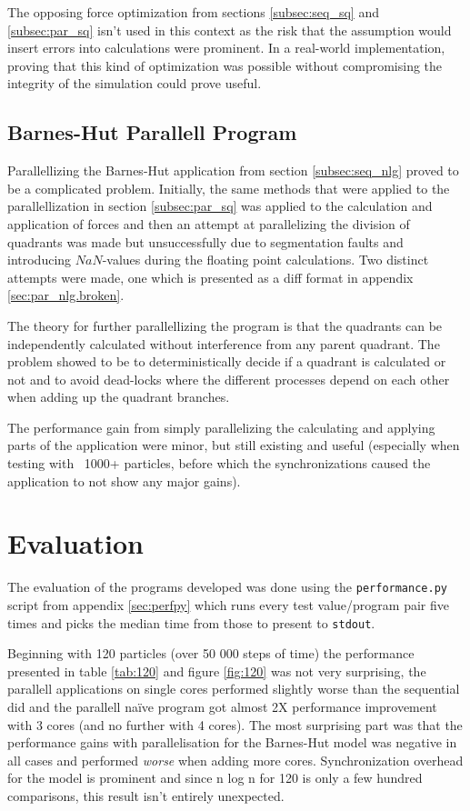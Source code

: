 \documentclass[titlepage,a4paper,12pt]{article}
\begin{document}
The opposing force optimization from sections \ref{subsec:seq_sq} and
\ref{subsec:par_sq} isn't used in this context as the risk that the assumption
would insert errors into calculations were prominent. In a real-world
implementation, proving that this kind of optimization was possible without
compromising the integrity of the simulation could prove useful.

\subsection{Barnes-Hut Parallell Program}
\label{subsec:par_nlg}
Parallellizing the Barnes-Hut application from section \ref{subsec:seq_nlg}
proved to be a complicated problem. Initially, the same methods that were
applied to the parallellization in section \ref{subsec:par_sq} was applied to
the calculation and application of forces and then an attempt at parallelizing
the division of quadrants was made but unsuccessfully due to segmentation faults
and introducing $NaN$-values during the floating point calculations.
Two distinct attempts were made, one which is presented as a diff format in
appendix \ref{sec:par_nlg.broken}.

The theory for further parallellizing the program is that the quadrants can be
independently calculated without interference from any parent quadrant. The
problem showed to be to deterministically decide if a quadrant is calculated or
not and to avoid dead-locks where the different processes depend on each other
when adding up the quadrant branches.

The performance gain from simply parallelizing the calculating and applying
parts of the application were minor, but still existing and useful (especially
when testing with ~1000+ particles, before which the synchronizations caused
the application to not show any major gains).

\section{Evaluation}

The evaluation of the programs developed was done using the
\texttt{performance.py} script from appendix \ref{sec:perfpy} which runs every
test value/program pair five times and picks the median time from those to
present to \texttt{stdout}.

Beginning with 120 particles (over 50 000 steps of time) the performance 
presented in table \ref{tab:120} and figure \ref{fig:120} was
not very surprising, the parallell applications on single cores performed
slightly worse than the sequential did and the parallell na\"{i}ve program
got almost 2X performance improvement with 3 cores (and no further with 4 
cores). The most surprising part was that the performance gains with
parallelisation for the Barnes-Hut model was negative in all cases and
performed \textit{worse} when adding more cores. Synchronization overhead
for the model is prominent and since n log n for 120 is only a few hundred
comparisons, this result isn't entirely unexpected.
\end{document}
